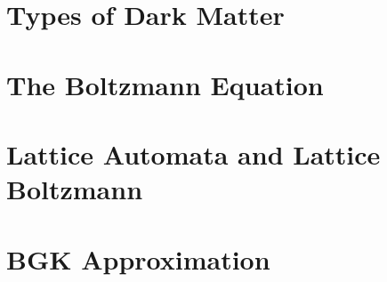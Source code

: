 \section{Types of Dark Matter}

\section{The Boltzmann Equation}

\section{Lattice Automata and Lattice Boltzmann}

\section{BGK Approximation}
\label{bgk}
